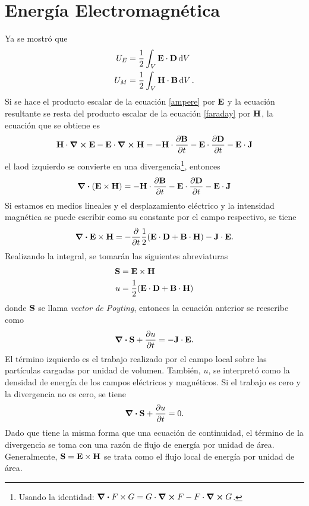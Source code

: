 \section{Energía Electromagnética}
Ya se mostró que
\begin{align}
    U_E &= \frac{1}{2} \int _V \vb{E} \cdot \vb{D} \dd{V} \\
    U_M &= \frac{1}{2} \int _V \vb{H} \cdot \vb{B} \dd{V}.
\end{align}
Si se hace el producto escalar de la ecuación \eqref{ampere} por $\vb{E}$ y la ecuación resultante se resta del producto escalar de la ecuación \eqref{faraday} por $\vb{H}$, la ecuación que se obtiene es
\begin{equation}
    \vb{H} \cdot \curl{\vb{E}} - \vb{E} \cdot \curl{\vb{H}} = -\vb{H} \cdot \pdv{\vb{B}}{t} - \vb{E} \cdot \pdv{\vb{D}}{t} - \vb{E} \cdot \vb{J}
\end{equation}
el laod izquierdo se convierte en una divergencia\footnote{Usando la identidad: $\div{F\times G} = G\cdot \curl{F} - F\cdot \curl{G}$.}, entonces
\begin{equation}
    \div{(\vb{E} \times \vb{H})} = -\vb{H} \cdot \pdv{\vb{B}}{t} - \vb{E} \cdot \pdv{\vb{D}}{t} - \vb{E} \cdot \vb{J}
\end{equation}
Si estamos en medios lineales y el desplazamiento eléctrico y la intensidad magnética se puede escribir como su constante por el campo respectivo, se tiene
\begin{equation}
    \div{\vb{E} \times \vb{H}} = -\pdv{t} \frac{1}{2} \qty(\vb{E} \cdot \vb{D} + \vb{B} \cdot \vb{H}) - \vb{J} \cdot \vb{E}.
\end{equation}
Realizando la integral, se tomarán las siguientes abreviaturas
\begin{align}
    \vb{S} &= \vb{E} \times \vb{H} \\
    u &= \frac{1}{2} \qty(\vb{E} \cdot \vb{D} + \vb{B} \cdot \vb{H})
\end{align}
donde $\vb{S}$ se llama \textit{vector de Poyting}, entonces la ecuación anterior se reescribe como
\begin{equation}
    \div{\vb{S}} + \pdv{u}{t} = -\vb{J} \cdot \vb{E}.
\end{equation}
El término izquierdo es el trabajo realizado por el campo local sobre las partículas cargadas por unidad de volumen. También, $u$, se interpretó como la densidad de energía de los campos eléctricos y magnéticos. Si el trabajo es cero y la divergencia no es cero, se tiene
\begin{equation}
    \div{\vb{S}} + \pdv{u}{t} = 0.
\end{equation}
Dado que tiene la misma forma que una ecuación de continuidad, el término de la divergencia se toma con una razón de flujo de energía por unidad de área. Generalmente, $\vb{S} = \vb{E} \times \vb{H}$ se trata como el flujo local de energía por unidad de área.

